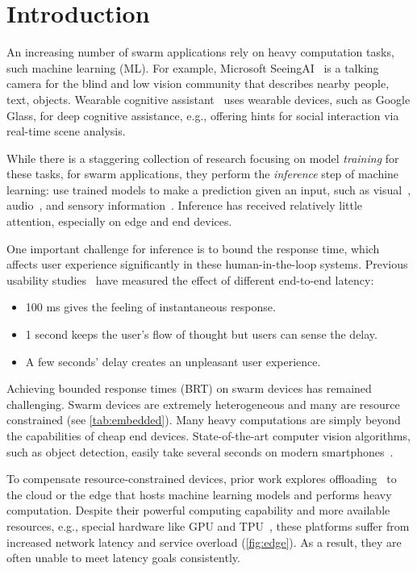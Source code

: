 \section{Introduction}
\label{sec:introduction}

An increasing number of swarm applications rely on heavy computation tasks, such
machine learning (ML). For example, Microsoft SeeingAI~\cite{seeingai} is a
talking camera for the blind and low vision community that describes nearby
people, text, objects. Wearable cognitive assistant~\cite{ha2014towards} uses
wearable devices, such as Google Glass, for deep cognitive assistance, e.g.,
offering hints for social interaction via real-time scene analysis.

While there is a staggering collection of research focusing on model
\textit{training} for these tasks, for swarm applications, they perform the
\textit{inference} step of machine learning: use trained models to make a
prediction given an input, such as visual~\cite{googlelens, ha2014towards,
  seeingai}, audio~\cite{alexa, applesiri, cortana}, and sensory
information~\cite{laput2017synthetic, lu2010jigsaw}. Inference has received
relatively little attention, especially on edge and end devices.

One important challenge for inference is to bound the response time, which
affects user experience significantly in these human-in-the-loop
systems. Previous usability studies~\cite{nielsen1994usability,
  schneiderman1998designing} have measured the effect of different end-to-end
latency:

\begin{itemize}[noitemsep, topsep=5pt]
\item 100 ms gives the feeling of instantaneous response.
\item 1 second keeps the user's flow of thought but users can sense the delay.
\item A few seconds' delay creates an unpleasant user experience.
\end{itemize}

Achieving bounded response times (BRT) on swarm devices has remained
challenging. Swarm devices are extremely heterogeneous and many are resource
constrained (see \autoref{tab:embedded}). Many heavy computations are simply
beyond the capabilities of cheap end devices. State-of-the-art computer vision
algorithms, such as object detection, easily take several seconds on modern
smartphones~\cite{chen2015glimpse}.

To compensate resource-constrained devices, prior work explores
offloading~\cite{chun2011clonecloud,cuervo2010maui} to the cloud or the edge
that hosts machine learning models and performs heavy computation. Despite their
powerful computing capability and more available resources, e.g., special
hardware like GPU and TPU~\cite{jouppi2017datacenter}, these platforms suffer
from increased network latency and service overload (\autoref{fig:edge}). As a
result, they are often unable to meet latency goals consistently.

